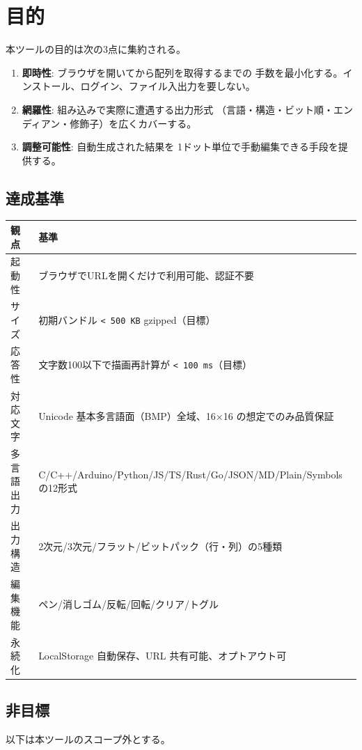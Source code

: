 \section{目的}

本ツールの目的は次の3点に集約される。

\begin{enumerate}[leftmargin=*,itemsep=2pt]
  \item \textbf{即時性}: ブラウザを開いてから配列を取得するまでの
        手数を最小化する。インストール、ログイン、ファイル入出力を要しない。
  \item \textbf{網羅性}: 組み込みで実際に遭遇する出力形式
        （言語・構造・ビット順・エンディアン・修飾子）を広くカバーする。
  \item \textbf{調整可能性}: 自動生成された結果を
        1ドット単位で手動編集できる手段を提供する。
\end{enumerate}

\subsection{達成基準}

\begin{tabularx}{\textwidth}{l X}
\toprule
\textbf{観点} & \textbf{基準} \\
\midrule
起動性 & ブラウザでURLを開くだけで利用可能、認証不要 \\
サイズ & 初期バンドル \texttt{< 500\,KB} gzipped（目標） \\
応答性 & 文字数100以下で描画再計算が \texttt{< 100\,ms}（目標） \\
対応文字 & Unicode 基本多言語面（BMP）全域、16×16 の想定でのみ品質保証 \\
多言語出力 & C/C++/Arduino/Python/JS/TS/Rust/Go/JSON/MD/Plain/Symbols の12形式 \\
出力構造 & 2次元/3次元/フラット/ビットパック（行・列）の5種類 \\
編集機能 & ペン/消しゴム/反転/回転/クリア/トグル \\
永続化 & LocalStorage 自動保存、URL 共有可能、オプトアウト可 \\
\bottomrule
\end{tabularx}

\subsection{非目標}

以下は本ツールのスコープ外とする。

